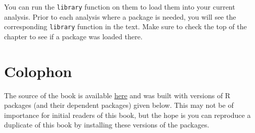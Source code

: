 \documentclass[]{tufte-book}
\newenvironment{Shaded}{\begin{snugshade}}{\end{snugshade}}
\newcommand{\KeywordTok}[1]{\textcolor[rgb]{0.13,0.29,0.53}{\textbf{{#1}}}}
\newcommand{\DataTypeTok}[1]{\textcolor[rgb]{0.13,0.29,0.53}{{#1}}}
\newcommand{\StringTok}[1]{\textcolor[rgb]{0.31,0.60,0.02}{{#1}}}
\newcommand{\NormalTok}[1]{{#1}}
\theoremstyle{definition}
\theoremstyle{definition}
\theoremstyle{remark}
\begin{document}
You can run the \texttt{library} function on them to load them into your
current analysis. Prior to each analysis where a package is needed, you
will see the corresponding \texttt{library} function in the text. Make
sure to check the top of the chapter to see if a package was loaded
there.

\begin{Shaded}
\end{Shaded}

\section*{Colophon}\label{colophon}

The source of the book is available
\href{https://github.com/ismayc/moderndiver-book}{here} and was built
with versions of R packages (and their dependent packages) given below.
This may not be of importance for initial readers of this book, but the
hope is you can reproduce a duplicate of this book by installing these
versions of the packages.
\end{document}
